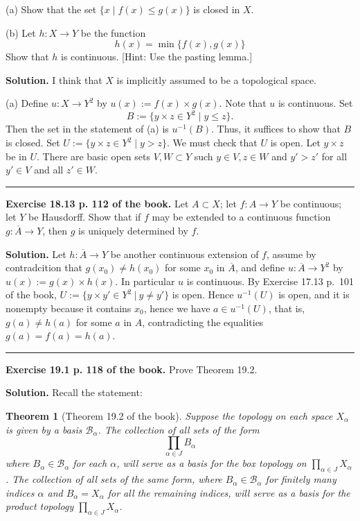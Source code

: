 \documentclass[12pt,letterpaper]{article}
\newtheorem{thm}{Theorem}%
\newcommand{\hs}{\bigskip\hrule\medskip}
\newcommand{\mc}{\mathcal}
\newcommand{\noi}{\noindent}%
\begin{document}
\noindent (a) Show that the set $\{x \mid f(x) \leq g(x)\}$ is closed in $X$.

\noindent (b) Let $h:X\rightarrow Y$ be the function
$$
h(x)=\min \{f(x), g(x)\}
$$
Show that $h$ is continuous. [Hint: Use the pasting lemma.]

\noi\textbf{Solution.} I think that $X$ is implicitly assumed to be a topological space. 

\noi(a) Define $u:X\to Y^2$ by $u(x):=f(x)\times g(x)$. Note that $u$ is continuous. Set 
$$
B:=\{y\times z\in Y^2\mid y\le z\}.
$$ 
Then the set in the statement of (a) is $u^{-1}(B)$. Thus, it suffices to show that $B$ is closed. Set $U:=\{y\times z\in Y^2\mid y>z\}$. We must check that $U$ is open. Let $y\times z$ be in $U$. There are basic open sets $V,W\subset Y$ such $y\in V,z\in W$ and $y'>z'$ for all $y'\in V$ and all $z'\in W$. 

\hs

\noi\textbf{Exercise 18.13 p. 112 of the book.} Let $A\subset X$; let $f:A\to Y$ be continuous; let $Y$ be Hausdorff. Show that if $f$ may be extended to a continuous function $g:\overline A\to Y$, then $g$ is uniquely determined by $f$. 

\noi\textbf{Solution.} Let $h:\overline A\to Y$ be another continuous extension of $f$, assume by contradcition that $g(x_0)\ne h(x_0)$ for some $x_0$ in $\overline A$, and define $u:\overline A\to Y^2$ by $u(x):=g(x)\times h(x)$. In particular $u$ is continuous. By Exercise 17.13 p.~101 of the book, $U:=\{y\times y'\in Y^2\ |\ y\ne y'\}$ is open. Hence $u^{-1}(U)$ is open, and it is nonempty because it contains $x_0$, hence we have $a\in u^{-1}(U)$, that is, $g(a)\ne h(a)$ for some $a$ in $A$, contradicting the equalities $g(a)=f(a)=h(a)$. 

\hs

\noi\textbf{Exercise 19.1 p. 118 of the book.} Prove Theorem 19.2. 

\noi\textbf{Solution.} Recall the statement: 

\begin{thm}[Theorem 19.2 of the book]
Suppose the topology on each space $X_{\alpha}$ is given by a basis $\mc{B}_{\alpha}$. The collection of all sets of the form
\[
\prod_{\alpha\in J}B_\alpha
\]
where $B_{\alpha}\in\mc B_\alpha$ for each $\alpha$, will serve as a basis for the box topology on $\prod_{\alpha \in J} X_{\alpha}$. The collection of all sets of the same form, where $B_{\alpha} \in \mc{B}_{\alpha}$ for finitely many indices $\alpha$ and $B_{\alpha}=X_{\alpha}$ for all the remaining indices, will serve as a basis for the product topology $\prod_{\alpha \in J} X_{\alpha}$. 
\end{thm} 
\end{document}
